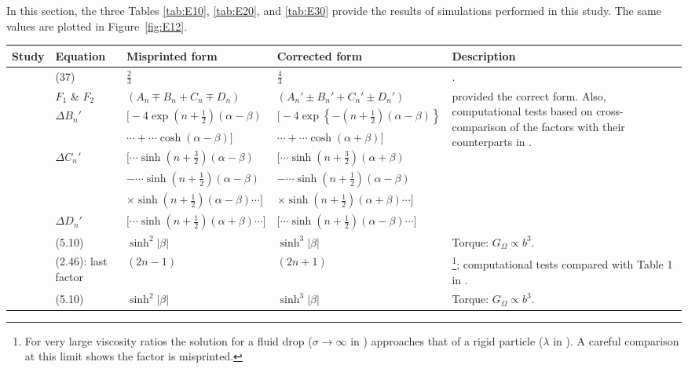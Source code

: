 \documentclass[../thesis.tex]{subfiles}
\begin{document}
In this section, the three Tables \ref{tab:E10}, \ref{tab:E20}, and \ref{tab:E30} provide the results of simulations performed in this study. The same values are plotted in Figure~\ref{fig:E12}.



\begin{landscape}

\begin{longtable}{p{3cm}p{3cm}p{5.0cm}p{5.25cm}p{5.5cm}}
 \hline
 Study & Equation & Misprinted form & Corrected form & Description \\ \hline
 \citet{SJ26} & (37) & $\frac{2}{3}$ & $\frac{4}{3}$ & \cite{HB83,M61}.\\ \hline
 
 \citet{M61} & $F_1$ \& $F_2$ & $(A_n \mp B_n + C_n \mp D_n)$ & $(A_n' \pm B_n' + C_n' \pm D_n')$ & \multirow[t]{7}{5.5cm}{\citet{GMS20} provided the correct form. Also, computational tests based on cross-comparison of the factors with their counterparts in \citet{SJ26}.} \\ \cline{2-4}
 & $\Delta B_n'$ & $\big[-4\exp\left(n+\tfrac{1}{2}\right)\left(\alpha-\beta\right)$ & $\big[-4\exp\left\{-\left(n+\tfrac{1}{2}\right)\left(\alpha-\beta\right)\right\}$ & \\ 
 & & $\cdots+\cdots\cosh\left(\alpha-\beta\right)\big]$ & $\cdots+\cdots\cosh\left(\alpha+\beta\right)\big]$ & \\ \cline{2-4}
 & $\Delta C_n'$ & $\big[\cdots\sinh\left(n+\tfrac{3}{2}\right)\left(\alpha-\beta\right)$ & $\big[\cdots\sinh\left(n+\tfrac{3}{2}\right)\left(\alpha+\beta\right)$ & \\ 
 & & $- \cdots\sinh\left(n+\tfrac{1}{2}\right)\left(\alpha-\beta\right)$ & $- \cdots\sinh\left(n+\tfrac{1}{2}\right)\left(\alpha-\beta\right)$ & \\
 & & $\times\sinh\left(n+\tfrac{1}{2}\right)\left(\alpha-\beta\right) \cdots \big]$ & $\times\sinh\left(n+\tfrac{1}{2}\right)\left(\alpha+\beta\right) \cdots \big]$ & \\ \cline{2-4}
 & $\Delta D_n'$ & $\big[\cdots\sinh\left(n+\tfrac{1}{2}\right)\left(\alpha+\beta\right) \cdots \big]$ & $\big[\cdots\sinh\left(n+\tfrac{1}{2}\right)\left(\alpha-\beta\right) \cdots \big]$ &
  \\ \hline
  
 \citet{ONM70} & (5.10) & $\sinh^2|\beta|$ & $\sinh^3|\beta|$ & Torque: $G_\Omega \propto b^3$.
 \\ \hline
 
 \citet{WW72} & (2.46): last factor & $\left(2n-1\right)$ & $\left(2n+1\right)$ & \footnote{For very large viscosity ratios the solution for a fluid drop ($\sigma\to\infty$ in \cite{WW72}) approaches that of a rigid particle ($\lambda$ in \cite{SJ26}). A careful comparison at this limit shows the factor is misprinted.}\cite{SJ26}; computational tests compared with Table 1 in \cite{WW72}.
 \\ \hline
 \citet{ONM70} & (5.10) & $\sinh^2|\beta|$ & $\sinh^3|\beta|$ & Torque: $G_\Omega \propto b^3$.
 \\ \hline
 

\end{longtable}
\end{landscape}
\end{document}
